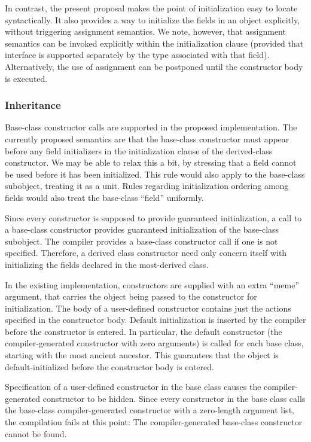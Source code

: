 In contrast, the present proposal makes the point of initialization
easy to locate syntactically.  It also provides a way to initialize the fields
in an object explicitly, without triggering assignment semantics.  
We note, however, that assignment semantics can be invoked explicitly within the
initialization clause (provided that interface is supported separately by the
type associated with that field).  Alternatively, the use of assignment can be
postponed until the constructor body is executed.

\subsubsection{Inheritance}

Base-class constructor calls are supported in the proposed implementation.  The
currently proposed semantics are that the base-class constructor must appear
before any field initializers in the initialization clause of the derived-class
constructor.  We may be able to relax this a bit, by stressing that a field
cannot be used before it has been initialized.  This rule would also apply to
the base-class subobject, treating it as a unit.  Rules regarding initialization
ordering among fields would also treat the base-class ``field'' uniformly.

Since every constructor is supposed to provide guaranteed initialization, a call
to a base-class constructor provides guaranteed initialization of the base-class
subobject.  The compiler provides a base-class constructor call if one is not
specified.  Therefore, a derived class constructor need only concern itself with
initializing the fields declared in the most-derived class.

In the existing implementation, constructors are supplied with an extra ``meme''
argument, that carries the object being passed to the constructor for
initialization.  The body of a user-defined constructor contains just the
actions specified in the constructor body.  Default initialization is inserted
by the compiler before the constructor is entered.  In particular, the default
constructor (the compiler-generated constructor with zero arguments) is called
for each base class, starting with the most ancient ancestor.  This guarantees
that the object is default-initialized before the constructor body is entered.

Specification of a user-defined constructor in the base class causes the
compiler-generated constructor to be hidden.  Since every constructor in the
base class calls the base-class compiler-generated constructor with a
zero-length argument list, the compilation fails at this point: The
compiler-generated base-class constructor cannot be found.

